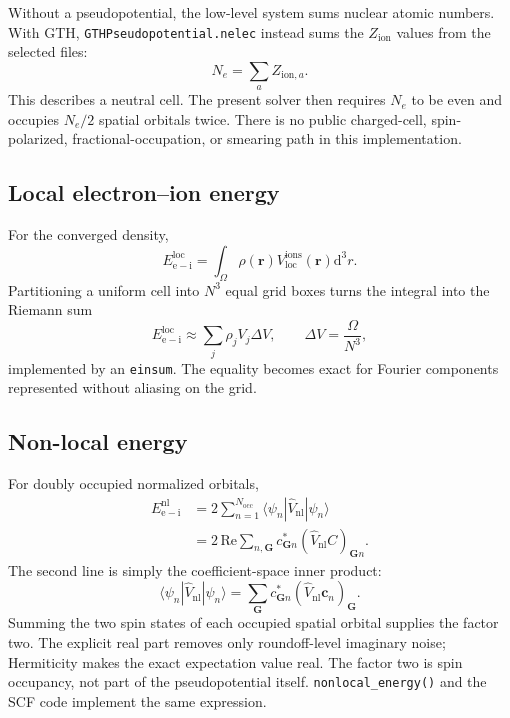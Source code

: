\documentclass[10pt,twocolumn]{article}
\newcommand{\dd}{\mathrm{d}}
\newcommand{\vnl}{\widehat V_{\mathrm{nl}}}
\newcommand{\zion}{Z_{\mathrm{ion}}}
\newcommand{\gvec}{\mathbf G}
\newcommand{\rvec}{\mathbf r}
\newcommand{\code}[1]{\texttt{#1}}
\begin{document}
Without a pseudopotential, the low-level system sums nuclear atomic numbers.
With GTH, \code{GTHPseudopotential.nelec} instead sums the \(\zion\) values
from the selected files:
\begin{equation}
N_e=\sum_a Z_{\mathrm{ion},a}.
\end{equation}
This describes a neutral cell.  The present solver then requires \(N_e\) to
be even and occupies \(N_e/2\) spatial orbitals twice.  There is no public
charged-cell, spin-polarized, fractional-occupation, or smearing path in this
implementation.

\subsection{Local electron--ion energy}

For the converged density,
\begin{equation}
E_{\mathrm{e-i}}^{\mathrm{loc}}
=\int_\Omega \rho(\rvec)
V_{\mathrm{loc}}^{\mathrm{ions}}(\rvec)\dd^3r.
\end{equation}
Partitioning a uniform cell into \(N^3\) equal grid boxes turns the integral
into the Riemann sum
\begin{equation}
E_{\mathrm{e-i}}^{\mathrm{loc}}
\approx\sum_j\rho_jV_j\Delta V,
\qquad
\Delta V=\frac{\Omega}{N^3},
\end{equation}
implemented by an \code{einsum}.  The equality becomes exact for Fourier
components represented without aliasing on the grid.

\subsection{Non-local energy}

For doubly occupied normalized orbitals,
\begin{align}
E_{\mathrm{e-i}}^{\mathrm{nl}}
&=2\sum_{n=1}^{N_{\mathrm{occ}}}
\langle\psi_n|\vnl|\psi_n\rangle\\
&=2\,\mathrm{Re}\!
\sum_{n,\gvec}c_{\gvec n}^*
(\vnl C)_{\gvec n}.
\label{eq:enl}
\end{align}
The second line is simply the coefficient-space inner product:
\begin{equation}
\langle\psi_n|\vnl|\psi_n\rangle
=\sum_\gvec c_{\gvec n}^*(\vnl\bm c_n)_\gvec.
\end{equation}
Summing the two spin states of each occupied spatial orbital supplies the
factor two.  The explicit real part removes only roundoff-level imaginary
noise; Hermiticity makes the exact expectation value real.
The factor two is spin occupancy, not part of the pseudopotential itself.
\code{nonlocal\_energy()} and the SCF code implement the same expression.
\end{document}

